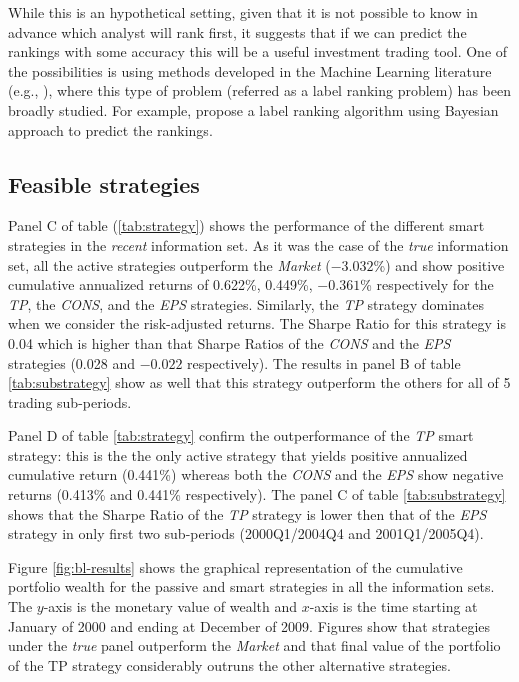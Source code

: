 \documentclass{article}\usepackage[]{graphicx}\usepackage[]{color}
\newcommand{\tr}{\textit{true}}
\newcommand{\naive}{\textit{recent}}
\begin{document}
While this is an hypothetical setting, given that it is not possible to know in advance which analyst will rank first, it suggests that if we can predict the rankings with some accuracy this will be a useful investment trading tool. One of the possibilities is using methods developed in the Machine Learning literature (e.g., \cite{aiguzhinov2010,brazdil2003}), where this type of problem (referred as a label ranking problem) has been broadly studied. For example, \cite{aiguzhinov2010} propose a label ranking algorithm using Bayesian approach to predict the rankings.



\subsection{Feasible strategies}
Panel C of table (\ref{tab:strategy}) shows the performance of the different smart strategies in the \naive{} information set. As it was the  case of the \tr{} information set, all the active strategies outperform the \textit{Market} (\ensuremath{-3.032}\%)  and show positive cumulative annualized returns of 0.622\%,  0.449\%, \ensuremath{-0.361}\% respectively for the \textit{TP}, the \textit{CONS}, and the \textit{EPS} strategies. Similarly, the \textit{TP} strategy dominates when we consider the risk-adjusted returns. The Sharpe Ratio for this strategy is 0.04 which is higher than that Sharpe Ratios of the \textit{CONS} and  the \textit{EPS} strategies  (0.028 and \ensuremath{-0.022} respectively). The results in panel B of table \ref{tab:substrategy} show as well that this strategy outperform the others for all of 5 trading sub-periods. 

Panel D of table \ref{tab:strategy} confirm the outperformance of the \textit{TP} smart strategy: this is the the only active strategy that yields positive annualized cumulative return (0.441\%) whereas both  the \textit{CONS} and the \textit{EPS} show negative returns (0.413\% and 0.441\% respectively). The panel C of table \ref{tab:substrategy} shows that the Sharpe Ratio of the \textit{TP} strategy is lower then that of the \textit{EPS} strategy in only first two sub-periods (2000Q1/2004Q4 and 2001Q1/2005Q4).


Figure \ref{fig:bl-results} shows the graphical representation of the cumulative portfolio wealth for  the passive and smart strategies in all the information sets. The $y$-axis is the monetary value of wealth and $x$-axis is the time starting at January of 2000 and ending at December of 2009. Figures show that strategies under the \tr{} panel outperform the \emph{Market} and that final value  of the portfolio of the TP strategy considerably outruns the other alternative strategies.
\end{document}
